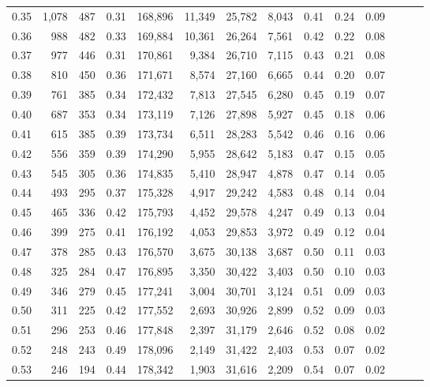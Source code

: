 \begin{tabular}{rrrrrrrrrrrrrr}
0.35 &  1,078 &    487 &  0.31 &  168,896 &   11,349 &  25,782 &   8,043 &  0.41 &  0.24 &      0.09 \\
0.36 &    988 &    482 &  0.33 &  169,884 &   10,361 &  26,264 &   7,561 &  0.42 &  0.22 &      0.08 \\
0.37 &    977 &    446 &  0.31 &  170,861 &    9,384 &  26,710 &   7,115 &  0.43 &  0.21 &      0.08 \\
0.38 &    810 &    450 &  0.36 &  171,671 &    8,574 &  27,160 &   6,665 &  0.44 &  0.20 &      0.07 \\
0.39 &    761 &    385 &  0.34 &  172,432 &    7,813 &  27,545 &   6,280 &  0.45 &  0.19 &      0.07 \\
0.40 &    687 &    353 &  0.34 &  173,119 &    7,126 &  27,898 &   5,927 &  0.45 &  0.18 &      0.06 \\
0.41 &    615 &    385 &  0.39 &  173,734 &    6,511 &  28,283 &   5,542 &  0.46 &  0.16 &      0.06 \\
0.42 &    556 &    359 &  0.39 &  174,290 &    5,955 &  28,642 &   5,183 &  0.47 &  0.15 &      0.05 \\
0.43 &    545 &    305 &  0.36 &  174,835 &    5,410 &  28,947 &   4,878 &  0.47 &  0.14 &      0.05 \\
0.44 &    493 &    295 &  0.37 &  175,328 &    4,917 &  29,242 &   4,583 &  0.48 &  0.14 &      0.04 \\
0.45 &    465 &    336 &  0.42 &  175,793 &    4,452 &  29,578 &   4,247 &  0.49 &  0.13 &      0.04 \\
0.46 &    399 &    275 &  0.41 &  176,192 &    4,053 &  29,853 &   3,972 &  0.49 &  0.12 &      0.04 \\
0.47 &    378 &    285 &  0.43 &  176,570 &    3,675 &  30,138 &   3,687 &  0.50 &  0.11 &      0.03 \\
0.48 &    325 &    284 &  0.47 &  176,895 &    3,350 &  30,422 &   3,403 &  0.50 &  0.10 &      0.03 \\
0.49 &    346 &    279 &  0.45 &  177,241 &    3,004 &  30,701 &   3,124 &  0.51 &  0.09 &      0.03 \\
0.50 &    311 &    225 &  0.42 &  177,552 &    2,693 &  30,926 &   2,899 &  0.52 &  0.09 &      0.03 \\
0.51 &    296 &    253 &  0.46 &  177,848 &    2,397 &  31,179 &   2,646 &  0.52 &  0.08 &      0.02 \\
0.52 &    248 &    243 &  0.49 &  178,096 &    2,149 &  31,422 &   2,403 &  0.53 &  0.07 &      0.02 \\
0.53 &    246 &    194 &  0.44 &  178,342 &    1,903 &  31,616 &   2,209 &  0.54 &  0.07 &      0.02 \\

\end{tabular}
